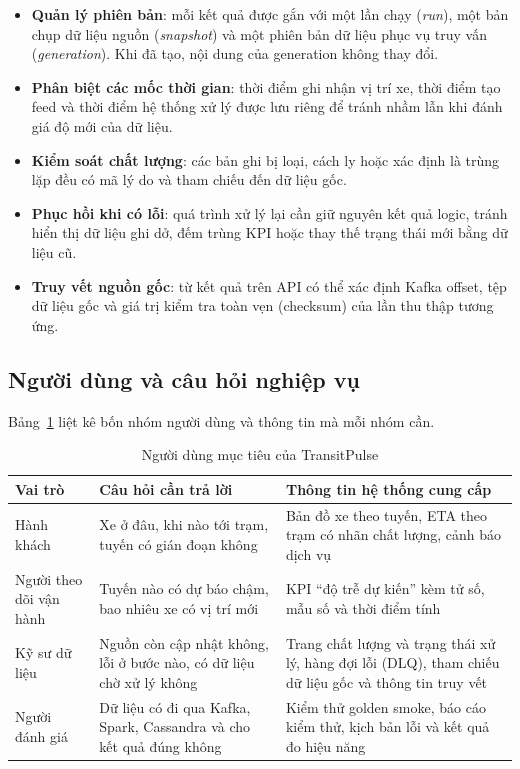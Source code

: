 \begin{itemize}
    \item \textbf{Quản lý phiên bản}: mỗi kết quả được gắn với một lần chạy (\textit{run}), một bản chụp dữ liệu nguồn (\textit{snapshot}) và một phiên bản dữ liệu phục vụ truy vấn (\textit{generation}). Khi đã tạo, nội dung của generation không thay đổi.
    \item \textbf{Phân biệt các mốc thời gian}: thời điểm ghi nhận vị trí xe, thời điểm tạo feed và thời điểm hệ thống xử lý được lưu riêng để tránh nhầm lẫn khi đánh giá độ mới của dữ liệu.
    \item \textbf{Kiểm soát chất lượng}: các bản ghi bị loại, cách ly hoặc xác định là trùng lặp đều có mã lý do và tham chiếu đến dữ liệu gốc.
    \item \textbf{Phục hồi khi có lỗi}: quá trình xử lý lại cần giữ nguyên kết quả logic, tránh hiển thị dữ liệu ghi dở, đếm trùng KPI hoặc thay thế trạng thái mới bằng dữ liệu cũ.
    \item \textbf{Truy vết nguồn gốc}: từ kết quả trên API có thể xác định Kafka offset, tệp dữ liệu gốc và giá trị kiểm tra toàn vẹn (checksum) của lần thu thập tương ứng.
\end{itemize}

\subsection{Người dùng và câu hỏi nghiệp vụ}

Bảng~\ref{tab:users} liệt kê bốn nhóm người dùng và thông tin mà mỗi nhóm cần.

\begin{table}[H]
\centering
\tablefont
\caption{Người dùng mục tiêu của TransitPulse}
\label{tab:users}
\begin{tabular}{p{3.10cm}p{6.01cm}p{6.01cm}}
\toprule
\textbf{Vai trò} & \textbf{Câu hỏi cần trả lời} & \textbf{Thông tin hệ thống cung cấp} \\
\midrule
Hành khách & Xe ở đâu, khi nào tới trạm, tuyến có gián đoạn không & Bản đồ xe theo tuyến, ETA theo trạm có nhãn chất lượng, cảnh báo dịch vụ \\
Người theo dõi vận hành & Tuyến nào có dự báo chậm, bao nhiêu xe có vị trí mới & KPI ``độ trễ dự kiến'' kèm tử số, mẫu số và thời điểm tính \\
Kỹ sư dữ liệu & Nguồn còn cập nhật không, lỗi ở bước nào, có dữ liệu chờ xử lý không & Trang chất lượng và trạng thái xử lý, hàng đợi lỗi (DLQ), tham chiếu dữ liệu gốc và thông tin truy vết \\
Người đánh giá & Dữ liệu có đi qua Kafka, Spark, Cassandra và cho kết quả đúng không & Kiểm thử golden smoke, báo cáo kiểm thử, kịch bản lỗi và kết quả đo hiệu năng \\
\bottomrule
\end{tabular}
\end{table}

